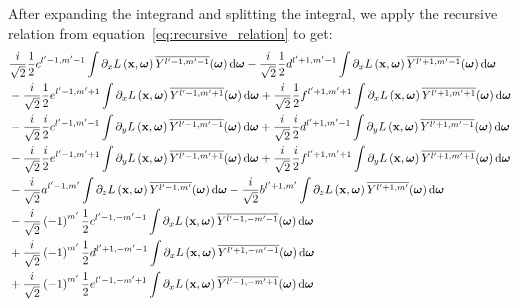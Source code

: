 After expanding the integrand and splitting the integral, we apply the recursive relation from equation~\ref{eq:recursive_relation} to get:
\begin{align*}
&
\frac{i}{\sqrt{2}}\frac{1}{2}c^{{l'-1,m'-1}}\int{\partial_xL\left (\vec{x} ,\vec{\omega} \right )\overline{Y^{l'-1, m'-1}}(\vec{\omega} )\ud\vec{\omega}}
-\frac{i}{\sqrt{2}}\frac{1}{2}d^{{l'+1,m'-1}}\int{\partial_xL\left (\vec{x} ,\vec{\omega} \right )\overline{Y^{l'+1, m'-1}}(\vec{\omega} )\ud\vec{\omega}}
\\&
-\frac{i}{\sqrt{2}}\frac{1}{2}e^{{l'-1,m'+1}}\int{\partial_xL\left (\vec{x} ,\vec{\omega} \right )\overline{Y^{l'-1, m'+1}}(\vec{\omega} )\ud\vec{\omega}}
+\frac{i}{\sqrt{2}}\frac{1}{2}f^{{l'+1,m'+1}}\int{\partial_xL\left (\vec{x} ,\vec{\omega} \right )\overline{Y^{l'+1, m'+1}}(\vec{\omega} )\ud\vec{\omega}}
\\&
-\frac{i}{\sqrt{2}}\frac{i}{2}c^{{l'-1,m'-1}}\int{\partial_yL\left (\vec{x} ,\vec{\omega} \right )\overline{Y^{l'-1, m'-1}}(\vec{\omega} )\ud\vec{\omega}}
+\frac{i}{\sqrt{2}}\frac{i}{2}d^{{l'+1,m'-1}}\int{\partial_yL\left (\vec{x} ,\vec{\omega} \right )\overline{Y^{l'+1, m'-1}}(\vec{\omega} )\ud\vec{\omega}}
\\&
-\frac{i}{\sqrt{2}}\frac{i}{2}e^{{l'-1,m'+1}}\int{\partial_yL\left (\vec{x} ,\vec{\omega} \right )\overline{Y^{l'-1, m'+1}}(\vec{\omega} )\ud\vec{\omega}}
+\frac{i}{\sqrt{2}}\frac{i}{2}f^{{l'+1,m'+1}}\int{\partial_yL\left (\vec{x} ,\vec{\omega} \right )\overline{Y^{l'+1, m'+1}}(\vec{\omega} )\ud\vec{\omega}}
\\&
-\frac{i}{\sqrt{2}}a^{{l'-1,m'}}\int{\partial_zL\left (\vec{x} ,\vec{\omega} \right )\overline{Y^{l'-1, m'}}(\vec{\omega} )\ud\vec{\omega}}
-\frac{i}{\sqrt{2}}b^{{l'+1,m'}}\int{\partial_zL\left (\vec{x} ,\vec{\omega} \right )\overline{Y^{l'+1, m'}}(\vec{\omega} )\ud\vec{\omega}}
\\&
-\frac{i}{\sqrt{2}}\left({-1}\right)^{m'}\frac{1}{2}c^{{l'-1,-m'-1}}\int{\partial_xL\left (\vec{x} ,\vec{\omega} \right )\overline{Y^{l'-1, -m'-1}}(\vec{\omega} )\ud\vec{\omega}}
\\&
+\frac{i}{\sqrt{2}}\left({-1}\right)^{m'}\frac{1}{2}d^{{l'+1,-m'-1}}\int{\partial_xL\left (\vec{x} ,\vec{\omega} \right )\overline{Y^{l'+1, -m'-1}}(\vec{\omega} )\ud\vec{\omega}}
\\&
+\frac{i}{\sqrt{2}}\left({-1}\right)^{m'}\frac{1}{2}e^{{l'-1,-m'+1}}\int{\partial_xL\left (\vec{x} ,\vec{\omega} \right )\overline{Y^{l'-1, -m'+1}}(\vec{\omega} )\ud\vec{\omega}}
\\&

\end{align*}
